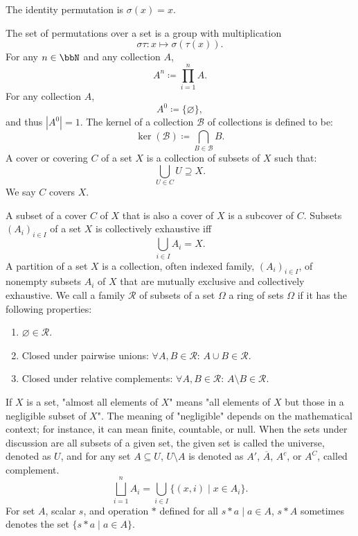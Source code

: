 \documentclass[a4paper,12pt]{article}
\begin{document}
The identity permutation is $\sigma(x)=x$.

The set of permutations over a set is a group with multiplication
\[\sigma\tau\colon x\mapsto\sigma(\tau(x)).\]
For any $n\in\bbN$ and any collection $A$,
\[A^n\coloneq\prod_{i=1}^nA.\]
For any collection $A$,
\[A^0\coloneq\{\varnothing\},\]
and thus $|A^0|=1$.
The kernel of a collection $\mathcal{B}$ of collections is defined to be:
\[\ker(\mathcal {B})\coloneq\bigcap_{B\in\mathcal{B}}B.\]
A cover or covering $C$ of a set $X$ is a collection of subsets of $X$ such that:
\[\bigcup_{U\in C}U\supseteq X.\]
We say $C$ covers $X$.

A subset of a cover $C$ of $X$ that is also a cover of $X$ is a subcover of $C$.
Subsets $(A_i)_{i\in I}$ of a set $X$ is collectively exhaustive iff
\[\bigcup_{i\in I}A_i=X.\]
A partition of a set $X$ is a collection, often indexed family, $(A_i)_{i\in I}$, of nonempty subsets $A_i$ of $X$ that are mutually exclusive and collectively exhaustive.
We call a family $\mathcal{R}$ of subsets of a set $\Omega$ a ring of sets  $\Omega$ if it has the following properties:
\begin{enumerate}
\item $\varnothing\in\mathcal{R}$.
\item Closed under pairwise unions: $\forall A,B\in\mathcal{R}:\,A\cup B\in\mathcal{R}$.
\item Closed under relative complements: $\forall A,B\in\mathcal{R}:\,A\setminus B\in\mathcal{R}$.
\end{enumerate}
If $X$ is a set, "almost all elements of $X$" means "all elements of $X$ but those in a negligible subset of $X$". The meaning of "negligible" depends on the mathematical context; for instance, it can mean finite, countable, or null.
When the sets under discussion are all subsets of a given set, the given set is called the universe, denoted as $U$, and for any set $A\subseteq U$, $U\setminus A$ is denoted as $A'$, $\overline{A}$, $A^c$, or $A^C$, called complement.
\[\bigsqcup_{i=1}^nA_i=\bigcup_{i\in I}\{(x,i)\mid x\in A_i\}.\]
For set $A$, scalar $s$, and operation $*$ defined for all $s*a\mid a\in A$, $s*A$ sometimes denotes the set $\{s*a\mid a\in A\}$.
\end{document}
